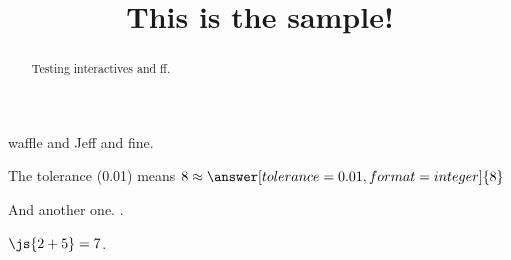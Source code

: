 \documentclass{ximera}
\title{This is the sample!}
\begin{document}
\begin{abstract}
Testing interactives and ff.
\end{abstract}

\maketitle

waffle and Jeff and fine.


 \begin{problem}
   The tolerance (0.01) means $8 \approx \answer[tolerance=0.01,format=integer]{8}$

   \begin{feedback}[72]
   \end{feedback}
 \end{problem}

And another one.  .

$\js{2+5} = 7$.
\end{document}
